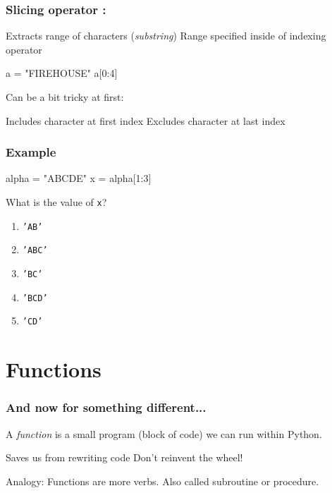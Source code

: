 \documentclass[11pt]{beamer}
\begin{document}
\begin{frame}[fragile]
  \frametitle{Slicing operator \textbf{:}}
  \Enlarge

  \begin{itemize}
  \myitem  Extracts range of characters (\emph{substring}) \pause
  \myitem  Range specified inside of indexing operator \pause
\begin{semiverbatim}
a = "FIREHOUSE"
a[0:4]
\end{semiverbatim} \pause
  \myitem  Can be a bit tricky at first:
    \begin{itemize}
    \mysubitem  Includes character at first index
    \mysubitem  Excludes character at last index
    \end{itemize}
  \end{itemize}
\end{frame}

\begin{frame}[fragile]
  \frametitle{Example}
  \Enlarge

  \begin{semiverbatim}
alpha = "ABCDE"
x = alpha[1:3]
  \end{semiverbatim}
  What is the value of \texttt{x}?
  \begin{enumerate}[label=\Alph*]
  \item  \texttt{'AB'}
  \item  \texttt{'ABC'}
  \item  \texttt{'BC'}
  \item  \texttt{'BCD'}
  \item  \texttt{'CD'}
  \end{enumerate}
\end{frame}

\section{Functions}

\begin{frame}
  \frametitle{And now for something different...}
  \Enlarge

  \begin{itemize}
  \myitem  A \emph{function} is a small program (block of code) we can run within Python. \pause
    \begin{itemize}
    \mysubitem  Saves us from rewriting code
    \mysubitem  Don't reinvent the wheel!
    \end{itemize} \pause
  \myitem  Analogy:  Functions are more verbs. \pause
  \myitem  Also called subroutine or procedure.
  \end{itemize}
\end{frame}
\end{document}
